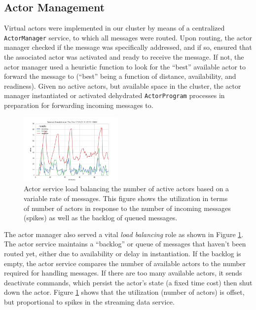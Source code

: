\documentclass[conference,twocolumn,10pt]{IEEEtran}
\begin{document}
\subsection{Actor Management}

Virtual actors were implemented in our cluster by means of a centralized \texttt{ActorManager} service, to which all messages were routed. Upon routing, the actor manager checked if the message was specifically addressed, and if so, ensured that the associated actor was activated and ready to receive the message. If not, the actor manager used a heuristic function to look for the ``best'' available actor to forward the message to (``best'' being a function of distance, availability, and readiness). Given no active actors, but available space in the cluster, the actor manager instantiated or activated dehydrated \texttt{ActorProgram} processes in preparation for forwarding incoming messages to.

\begin{figure}[!h]
    \centering
    \includegraphics[width=0.45\textwidth]{balance_sim_queue_lag_zero}
    \caption{Actor service load balancing the number of active actors based on a variable rate of messages. This figure shows the utilization in terms of number of actors in response to the number of incoming messages (spikes) as well as the backlog of queued messages.}
    \label{fig:load_balance}
\end{figure}

The actor manager also served a vital \textit{load balancing} role as shown in Figure \ref{fig:load_balance}. The actor service maintains a ``backlog'' or queue of messages that haven't been routed yet, either due to availability or delay in instantiation. If the backlog is empty, the actor service compares the number of available actors to the number required for handling messages. If there are too many available actors, it sends deactivate commands, which persist the actor's state (a fixed time cost) then shut down the actor. Figure \ref{fig:load_balance} shows that the utilization (number of actors) is offset, but proportional to spikes in the streaming data service.
\end{document}

